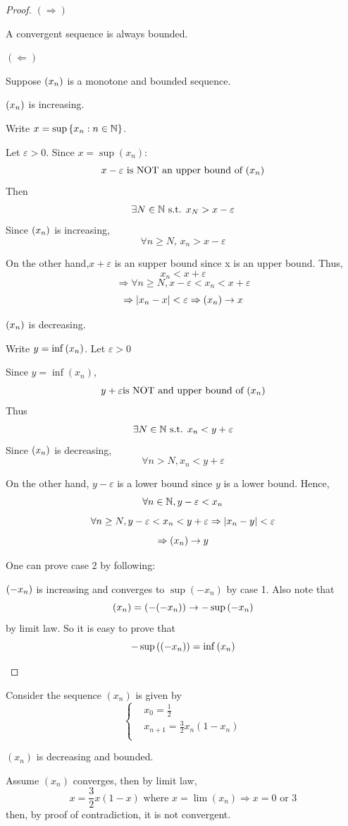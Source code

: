 \documentclass[a4paper,12pt]{article}
\begin{document}
\begin{proof}\((\Rightarrow)\)

    A convergent sequence is always bounded.

    \((\Leftarrow)\) 
    
    Suppose \((x_{n})\) is a monotone and bounded sequence.

     \((x_{n})\) is increasing.

    Write \(x = \sup{\{x_n:n\in\mathbb{N}\}}\).

    Let \(\varepsilon>0\). Since \(x = \sup{(x_n)}\):
    \[x-\varepsilon \text{ is NOT an upper bound of } (x_{n})\]
    Then 
    \[\exists N\in\mathbb{N} \text{ s.t. } x_N > x-\varepsilon\]
    Since \((x_{n})\) is increasing,
    \[\forall n\ge N,\, x_n>x-\varepsilon\]

    On the other hand,\(x+\varepsilon\) is an supper bound since x is an upper bound. Thus,
    \[x_n<x+\varepsilon\]
    \[\Rightarrow \forall n\ge N, x-\varepsilon<x_n<x+\varepsilon\]
    \[\Rightarrow \left\lvert x_n - x\right\rvert<\varepsilon\Rightarrow(x_{n})\rightarrow x\]

     \((x_{n})\) is decreasing.

    Write \(y = \inf{(x_{n})}\). Let \(\varepsilon>0\)

    Since \(y = \inf{(x_n)}\),
    \[y+\varepsilon \text{is NOT and upper bound of }(x_{n})\]
    Thus
    \[\exists N \in\mathbb{N} \text{ s.t. } x_n<y+\varepsilon\]
    Since \((x_{n})\) is decreasing,
    \[\forall n>N, x_n<y+\varepsilon\]
    
    On the other hand, \(y-\varepsilon\) is a lower bound since \(y\) is a lower bound. Hence, 
    \[\forall n\in\mathbb{N},  y-\varepsilon<x_n\]
    \[\forall n\ge N, y-\varepsilon<x_n<y+\varepsilon \Rightarrow\left\lvert x_n-y\right\rvert<\varepsilon\]
    \[\Rightarrow (x_{n})\rightarrow y\]

    \begin{remark}
        One can prove case 2 by following: 
        
        \((-x_{n})\) is increasing and converges to \(\sup{(-x_n)}\) by case 1.
        Also note that \[(x_{n}) = (-(-x_{n}))\rightarrow -\sup{(-x_{n})}\]
        by limit law. So it is easy to prove that \[-\sup{((-x_{n}))} = \inf{(x_n)}\]
    \end{remark}
\end{proof}

\begin{example}
    Consider the sequence \((x_n)\) is given by 
        \[\begin{cases}
            & x_0 = \frac{1}{2}\\
            & x_{n+1} = \frac{3}{2}x_n(1-x_n)\\
        \end{cases}\]

    \((x_n)\) is decreasing and  bounded.

     Assume \((x_n)\) converges, then by limit law,
    \[x = \frac{3}{2}x(1-x)\text{ where }x=\lim(x_n)\Rightarrow x = 0\text{ or }3\]
    then, by proof of contradiction, it is not convergent.
\end{example}
\end{document}
